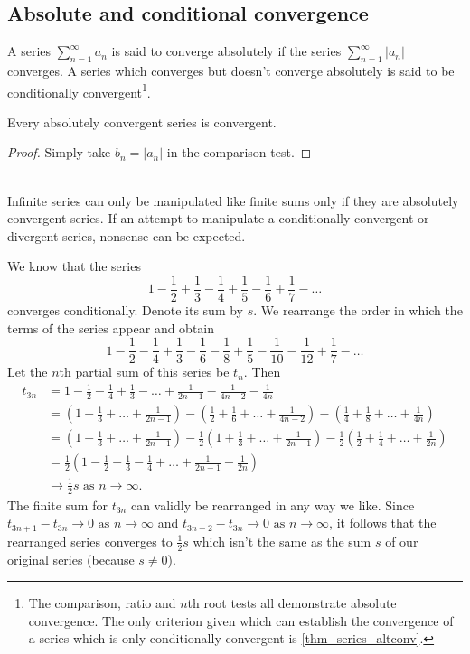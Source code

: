 \documentclass[10pt, a4paper]{article}
\newcommand{\limas}[3][n]{#2 \rightarrow #3 \text{ as } #1 \rightarrow \infty}
\newcommand{\sumfrto}[3][n = 1]{\sum_{#1}^{#2}{#3}} %
\newcommand{\sumto}[2][\infty]{\sumfrto{#1}{#2}}
\begin{document}
\subsection{Absolute and conditional convergence}
A series $\sumto{a_n}$ is said to converge absolutely if the series $\sumto{|a_n|}$ converges. A series which converges but doesn't converge absolutely is said to be conditionally convergent\footnote{The comparison, ratio and $n$th root tests all demonstrate absolute convergence. The only criterion given which can establish the convergence of a series which is only conditionally convergent is \autoref{thm_series_altconv}.}.

\begin{theorem}
    Every absolutely convergent series is convergent.
    \begin{proof}
        Simply take $b_n = |a_n|$ in the comparison test.
    \end{proof}
\end{theorem}
\phantom{} \\
Infinite series can only be manipulated like finite sums only if they are absolutely convergent series. If an attempt to manipulate a conditionally convergent or divergent series, nonsense can be expected.

\begin{example}
    We know that the series
    $$1 - \frac{1}{2} + \frac{1}{3} - \frac{1}{4} + \frac{1}{5} - \frac{1}{6} + \frac{1}{7} - \dotsc$$
    converges conditionally. Denote its sum by $s$. We rearrange the order in which the terms of the series appear and obtain
    $$1 - \frac{1}{2} - \frac{1}{4} + \frac{1}{3} - \frac{1}{6} - \frac{1}{8} + \frac{1}{5} - \frac{1}{10} - \frac{1}{12} + \frac{1}{7} - \dotsc$$
    Let the $n$th partial sum of this series be $t_n$. Then
    \begin{align*}
        t_{3n} &= 1 - \frac{1}{2} - \frac{1}{4} + \frac{1}{3} - \dotsc + \frac{1}{2n - 1} - \frac{1}{4n - 2} - \frac{1}{4n} \\
        &= \left(1 + \frac{1}{3} + \dotsc + \frac{1}{2n - 1}\right) - \left(\frac{1}{2} + \frac{1}{6} +  \dotsc + \frac{1}{4n - 2}\right) - \left(\frac{1}{4} + \frac{1}{8} + \dotsc +\frac{1}{4n}\right) \\
        &= \left(1 + \frac{1}{3} + \dotsc + \frac{1}{2n - 1}\right) - \frac{1}{2}\left(1 + \frac{1}{3} +  \dotsc + \frac{1}{2n - 1}\right) - \frac{1}{2}\left(\frac{1}{2} + \frac{1}{4} +  \dotsc + \frac{1}{2n}\right) \\
        &= \frac{1}{2}\left(1 - \frac{1}{2} + \frac{1}{3} - \frac{1}{4} + \dotsc + \frac{1}{2n - 1} - \frac{1}{2n}\right) \\
        &\limas{}{\frac{1}{2}s}.
    \end{align*}
    The finite sum for $t_{3n}$ can validly be rearranged in any way we like. Since $\limas{t_{3n + 1} - t_{3n}}{0}$ and $\limas{t_{3n + 2} - t_{3n}}{0}$, it follows that the rearranged series converges to $\frac{1}{2}s$ which isn't the same as the sum $s$ of our original series (because $s \neq 0$).
\end{example}
\end{document}

